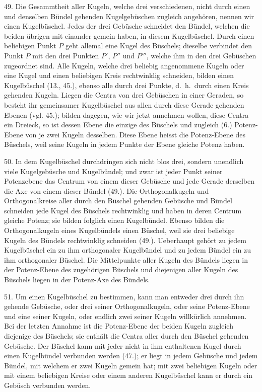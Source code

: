 
49. Die Gesammtheit aller Kugeln, welche drei verschiedenen,
nicht durch einen und denselben B\"undel gehenden
Kugelgeb\"uschen zugleich angeh\"oren, nennen wir einen
{\glqq}Kugelb\"uschel{\grqq}. Jedes der drei Geb\"usche schneidet den
B\"undel, welchen die beiden \"ubrigen mit einander gemein
haben, in diesem Kugelb\"uschel. Durch einen beliebigen
Punkt $P$ geht allemal eine Kugel des B\"uschels; dieselbe verbindet
den Punkt $P$ mit den drei Punkten $P'$, $P''$ und $P'''$,
welche ihm in den drei Geb\"uschen zugeordnet sind. Alle
Kugeln, welche drei beliebig angenommene Kugeln oder eine
Kugel und einen beliebigen Kreis rechtwinklig schneiden,
bilden einen Kugelb\"uschel (13., 45.), ebenso alle durch drei
Punkte, d.~h.\ durch einen Kreis gehenden Kugeln. Liegen
die Centra von drei Geb\"uschen in einer Geraden, so besteht
ihr gemeinsamer Kugelb\"uschel aus allen durch diese Gerade
gehenden Ebenen (vgl. 45.); bilden dagegen, wie wir jetzt
annehmen wollen, diese Centra ein Dreieck, so ist dessen
Ebene die einzige des B\"uschels und zugleich (6.) Potenz-Ebene
von je zwei Kugeln desselben. Diese Ebene heisst
die {\glqq}Potenz-Ebene des B\"uschels{\grqq}, weil seine Kugeln in jedem
Punkte der Ebene gleiche Potenz haben.

50. In dem Kugelb\"uschel durchdringen sich nicht blos
drei, sondern unendlich viele Kugelgeb\"usche und Kugelb\"undel;
und zwar ist jeder Punkt seiner Potenzebene das Centrum
von einem dieser Geb\"usche und jede Gerade derselben die
Axe von einem dieser B\"undel (49.). Die Orthogonalkugeln
und Orthogonalkreise aller durch den B\"uschel gehenden Geb\"usche
und B\"undel schneiden jede Kugel des B\"uschels rechtwinklig
und haben in deren Centrum gleiche Potenz; sie
bilden folglich einen Kugelb\"undel. Ebenso bilden die Orthogonalkugeln
eines Kugelb\"undels einen B\"uschel, weil sie drei
beliebige Kugeln des B\"undels rechtwinklig schneiden (49.).
Ueberhaupt geh\"ort zu jedem Kugelb\"uschel ein zu ihm orthogonaler
Kugelb\"undel und zu jedem B\"undel ein zu ihm orthogonaler
B\"uschel. Die Mittelpunkte aller Kugeln des B\"undels
liegen in der Potenz-Ebene des zugeh\"origen B\"uschels und
diejenigen aller Kugeln des B\"uschels liegen in der Potenz-Axe
des B\"undels.

51. Um einen Kugelb\"uschel zu bestimmen, kann man
entweder drei durch ihn gehende Geb\"usche, oder drei seiner
Orthogonalkugeln, oder seine Potenz-Ebene und eine seiner
Kugeln, oder endlich zwei seiner Kugeln willk\"urlich annehmen.
Bei der letzten Annahme ist die Potenz-Ebene der
beiden Kugeln zugleich diejenige des B\"uschels; sie enth\"alt
die Centra aller durch den B\"uschel gehenden Geb\"usche. Der
B\"uschel kann mit jeder nicht in ihm enthaltenen Kugel
durch einen Kugelb\"undel verbunden werden (47.); er liegt
in jedem Geb\"usche und jedem B\"undel, mit welchem er zwei
Kugeln gemein hat; mit zwei beliebigen Kugeln oder mit
einem beliebigen Kreise oder einem anderen Kugelb\"uschel
kann er durch ein Geb\"usch verbunden werden.

